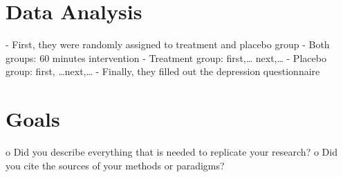\section{Data Analysis}
\label{data-analysis}

- First, they were randomly assigned to treatment and placebo group
- Both groups: 60 minutes intervention
- Treatment group: first,… next,…
- Placebo group: first, …next,…
- Finally, they filled out the depression questionnaire

\section{Goals}
\label{chapter3-goals}

o Did you describe everything that is needed to replicate your research?
o Did you cite the sources of your methods or paradigms?
